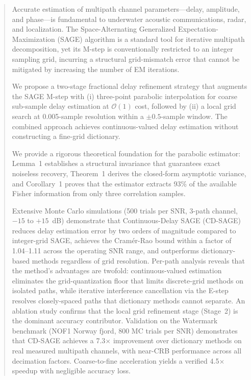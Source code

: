 \documentclass[a4paper,fleqn]{cas-dc}
\newcommand{\bigO}{\mathcal{O}}
\begin{document}

\fntext[1]{}


\begin{abstract}
Accurate estimation of multipath channel parameters---delay, amplitude, and phase---is fundamental to underwater acoustic communications, radar, and localization. The Space-Alternating Generalized Expectation-Maximization (SAGE) algorithm is a standard tool for iterative multipath decomposition, yet its M-step is conventionally restricted to an integer sampling grid, incurring a structural grid-mismatch error that cannot be mitigated by increasing the number of EM iterations.

We propose a two-stage fractional delay refinement strategy that augments the SAGE M-step with (i) three-point parabolic interpolation for coarse sub-sample delay estimation at $\bigO(1)$ cost, followed by (ii) a local grid search at 0.005-sample resolution within a $\pm 0.5$-sample window. The combined approach achieves continuous-valued delay estimation without constructing a fine-grid dictionary.

We provide a rigorous theoretical foundation for the parabolic estimator: Lemma~1 establishes a structural invariance that guarantees exact noiseless recovery, Theorem~1 derives the closed-form asymptotic variance, and Corollary~1 proves that the estimator extracts 93\% of the available Fisher information from only three correlation samples.

Extensive Monte Carlo simulations (500 trials per SNR, 3-path channel, $-15$ to $+15$~dB) demonstrate that Continuous-Delay SAGE (CD-SAGE) reduces delay estimation error by two orders of magnitude compared to integer-grid SAGE, achieves the Cram\'{e}r-Rao bound within a factor of 1.04--1.11 across the operating SNR range, and outperforms dictionary-based methods regardless of grid resolution. Per-path analysis reveals that the method's advantages are twofold: continuous-valued estimation eliminates the grid-quantization floor that limits discrete-grid methods on isolated paths, while iterative interference cancellation via the E-step resolves closely-spaced paths that dictionary methods cannot separate. An ablation study confirms that the local grid refinement stage (Stage~2) is the dominant accuracy contributor. Validation on the Watermark benchmark (NOF1 Norway fjord, 800 MC trials per SNR) demonstrates that CD-SAGE achieves a 7.3$\times$ improvement over dictionary methods on real measured multipath channels, with near-CRB performance across all decimation factors. Coarse-to-fine acceleration yields a verified 4.5$\times$ speedup with negligible accuracy loss.
\end{abstract}
\end{document}
